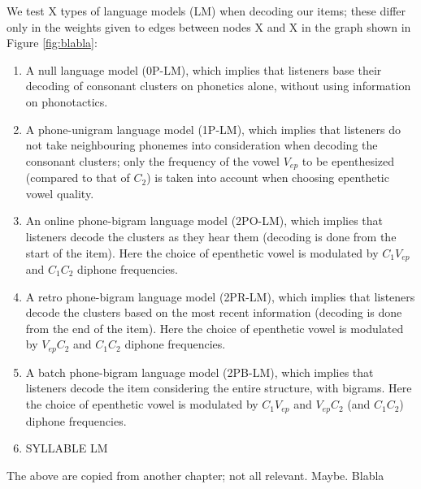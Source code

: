 We test {\color{red}X} types of language models (LM) when decoding our items; these differ only in the weights given to edges between nodes {\color{red}X and X} in the graph shown in Figure \ref{fig:blabla}: 
\begin{enumerate}
    \item A null language model (\textsc{0P-LM}), which implies that listeners base their decoding of consonant clusters on phonetics alone, without using information on phonotactics.
    \item A phone-unigram language model (\textsc{1P-LM}), which implies that listeners do not take neighbouring phonemes into consideration when decoding the consonant clusters; only the frequency of the vowel $V_{ep}$ to be epenthesized (compared to that of $C_{2}$) is taken into account when choosing epenthetic vowel quality.
    \item An online phone-bigram language model (\textsc{2PO-LM}), which implies that listeners decode the clusters as they hear them (decoding is done from the start of the item). Here the choice of epenthetic vowel is modulated by $C_{1}V_{ep}$ and $C_{1}C_{2}$ diphone frequencies. 
    \item A retro phone-bigram language model (\textsc{2PR-LM}), which implies that listeners decode the clusters based on the most recent information (decoding is done from the end of the item). Here the choice of epenthetic vowel is modulated by $V_{ep}C_{2}$ and $C_{1}C_{2}$ diphone frequencies.
    \item A batch phone-bigram language model (\textsc{2PB-LM}), which implies that listeners decode the item considering the entire structure, with bigrams. Here the choice of epenthetic vowel is modulated by $C_{1}V_{ep}$ and $V_{ep}C_{2}$ (and $C_{1}C_{2}$) diphone frequencies.  
    \item {\color{red}SYLLABLE LM}
\end{enumerate}
{\color{red}The above are copied from another chapter; not all relevant. Maybe. Blabla}



